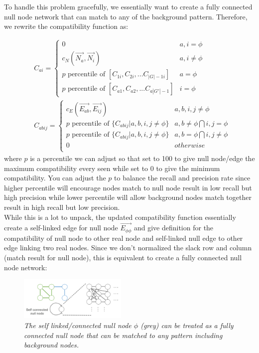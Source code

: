 To handle this problem gracefully, we essentially want to create a fully connected null node network that can match to any of the background pattern. Therefore, we rewrite the compatibility function as:

\begin{align} 
& C_{ai}  = \begin{cases}
0 & a,i=\phi \\
c_N(\overrightarrow{N_{a}},\overrightarrow{N_{i}}) & a, i\neq\phi \\
p \text{ percentile of }[C_{1i}, C_{2i},...C_{|G|-1i}] & a=\phi\\
p \text{ percentile of }[C_{a1}, C_{a2},...C_{a|G'|-1}] & i=\phi
\end{cases}\\
& C_{abij} = \begin{cases}
c_E(\overrightarrow{E_{ab}},\overrightarrow{E_{ij}})  & a,b,i,j\neq\phi \\
p \text{ percentile of }\{C_{abij}|a,b,i,j\neq\phi\} & a,b\neq\phi \bigcap i,j=\phi\\
p \text{ percentile of }\{C_{abij}|a,b,i,j\neq\phi\} & a,b=\phi \bigcap i,j\neq\phi\\
0 & otherwise\\
\end{cases}
\end{align}
where $p$ is a percentile we can adjust so that set to 100 to give null node/edge the maximum compatibility every seen while set to 0 to give the minimum compatibility. You can adjust the $p$ to balance the recall and precision rate since higher percentile will encourage nodes match to null node result in low recall but high precision while lower percentile will allow background nodes match together result in high recall but low precision.\\

While this is a lot to unpack, the updated compatibility function essentially create a self-linked edge for null node $\overrightarrow{E_{\phi\phi}}$ and give definition for the compatibility of null node to other real node and self-linked null edge to other edge linking two real nodes. Since we don't normalized the slack row and column (match result for null node), this is equivalent to create a fully connected null node network:

\begin{figure}[h]
	\centering
	\captionsetup{justification=centering}
	\includegraphics[width=0.46\textwidth]{figs/null_node_network.png}
	\caption[Caption for LOF]{\emph{The self linked/connected null node $\phi$ (grey) can be treated as a fully connected null node that can be matched to any pattern including background nodes. }}
	\label{fig:stochastic}
\end{figure}

